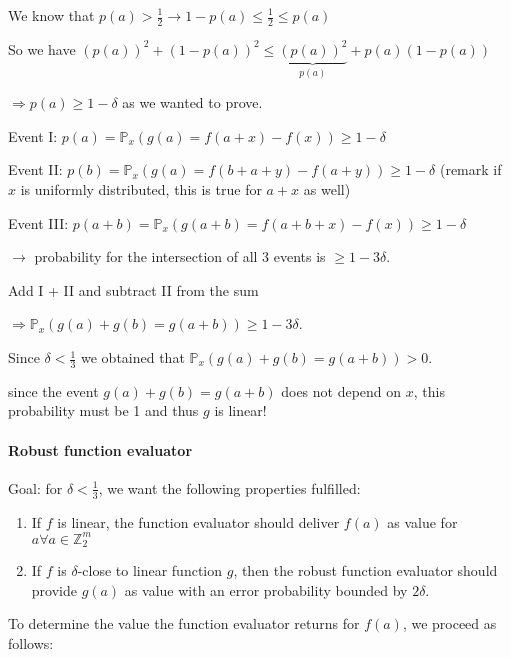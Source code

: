 \documentclass[11pt]{article}
\theoremstyle{definition}
\theoremstyle{definition}
\begin{document}
\begin{enumerate}
\begin{itemize}
	We know that $ p(a) > \frac{1}{2} \rightarrow 1 - p(a) \leq \frac{1}{2} \leq p(a) $
	
	So we have $ (p(a))^2 + (1 - p(a))^2 \leq \underbrace{(p(a))^2}_{p(a)} + p(a) (1 - p(a)) $
	
	$ \Rightarrow p(a) \geq 1 - \delta $ as we wanted to prove.
	\end{itemize}
	
	Event I: $ p(a) = \mathbb{P}_x (g (a) = f(a + x) - f(x) ) \geq 1 - \delta $
	
	Event II: $ p(b) = \mathbb{P}_x (g (a) = f(b + a + y) - f(a + y) ) \geq 1 - \delta $ (remark if $ x $ is uniformly distributed, this is true for $ a + x $ as well)
	
	Event III: $ p(a + b) = \mathbb{P}_x (g(a + b) = f(a + b+ x) - f(x) ) \geq 1 - \delta $
	
	$ \rightarrow $ probability for the intersection of all 3 events is $ \geq 1 - 3 \delta $.
	
	Add I + II and subtract II from the sum 
	
	$ \Rightarrow \mathbb{P}_x(g (a) + g(b) = g(a + b)) \geq 1 - 3 \delta $.
	
	Since $ \delta < \frac{1}{3} $ we obtained that $ \mathbb{P}_x (g (a) + g(b) = g(a + b)) > 0 $.
	
	since the event $ g(a) + g(b) = g(a + b) $ does not depend on $ x $, this probability must be 1 and thus $ g $ is linear!
	
\end{enumerate}

\paragraph{Robust function evaluator}

Goal: for $ \delta < \frac{1}{3} $, we want the following properties fulfilled:

\begin{enumerate}
	\item If $ f $ is linear, the function evaluator should deliver $ f(a) $ as value for $ a \forall a \in \mathbb{Z}_2^m $
	\item If $ f $ is $ \delta $-close to linear function $ g $, then the robust function evaluator should provide $ g(a) $ as value with an error probability bounded by $ 2 \delta $.
\end{enumerate}

To determine the value the function evaluator returns for $ f(a) $, we proceed as follows:
\end{document}
